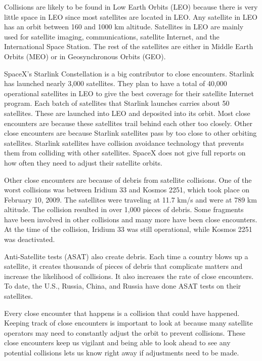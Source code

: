 \documentclass[11pt, a4paper, twocolumn]{article}
\begin{document}
	Collisions are likely to be found in Low Earth Orbits (LEO) because there is very little space in LEO since most satellites are located in LEO. Any satellite in LEO has an orbit between 160 and 1000 km altitude. Satellites in LEO are mainly used for satellite imaging, communications, satellite Internet, and the International Space Station. The rest of the satellites are either in Middle Earth Orbits (MEO) or in Geosynchronous Orbits (GEO). 
	
	SpaceX's Starlink Constellation is a big contributor to close encounters. Starlink has launched nearly 3,000 satellites. They plan to have a total of 40,000 operational satellites in LEO to give the best coverage for their satellite Internet program. Each batch of satellites that Starlink launches carries about 50 satellites. These are launched into LEO and deposited into its orbit. Most close encounters are because these satellites trail behind each other too closely. Other close encounters are because Starlink satellites pass by too close to other orbiting satellites. Starlink satellites have collision avoidance technology that prevents them from colliding with other satellites. SpaceX does not give full reports on how often they need to adjust their satellite orbits. 
	
	Other close encounters are because of debris from satellite collisions. One of the worst collisions was between Iridium 33 and Kosmos 2251, which took place on February 10, 2009. The satellites were traveling at 11.7 km/s and were at 789 km altitude. The collision resulted in over 1,000 pieces of debris. Some fragments have been involved in other collisions and many more have been close encounters. At the time of the collision, Iridium 33 was still operational, while Kosmos 2251 was deactivated. 
	
	Anti-Satellite tests (ASAT) also create debris. Each time a country blows up a satellite, it creates thousands of pieces of debris that complicate matters and increase the likelihood of collisions. It also increases the rate of close encounters.  To date, the U.S., Russia, China, and Russia have done ASAT tests on their satellites. 
	
	Every close encounter that happens is a collision that could have happened. Keeping track of close encounters is important to look at because many satellite operators may need to constantly adjust the orbit to prevent collisions. These close encounters keep us vigilant and being able to look ahead to see any potential collisions lets us know right away if adjustments need to be made. 
\end{document}
